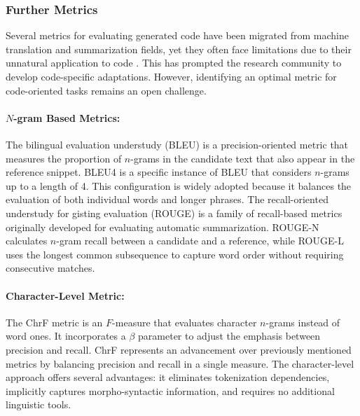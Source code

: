 
\subsubsection*{Further Metrics}

Several metrics for evaluating generated code have been migrated from machine translation and summarization fields, yet they often face limitations due to their unnatural application to code \parencite{evtikhiev2022}. This has prompted the research community to develop code-specific adaptations. However, identifying an optimal metric for code-oriented tasks remains an open challenge.

\begin{sloppypar}
\paragraph{\(N\)-gram Based Metrics:} The bilingual evaluation understudy (BLEU) \parencite{papineni2002} is a precision-oriented metric that measures the proportion of \(n\)-grams in the candidate text that also appear in the reference snippet. BLEU4 is a specific instance of BLEU that considers \(n\)-grams up to a length of 4. This configuration is widely adopted because it balances the evaluation of both individual words and longer phrases. The recall-oriented understudy for gisting evaluation (ROUGE) \parencite{lin2004} is a family of recall-based metrics originally developed for evaluating automatic summarization. ROUGE-N calculates \(n\)-gram recall between a candidate and a reference, while ROUGE-L uses the longest common subsequence to capture word order without requiring consecutive matches.
\end{sloppypar}

\begin{sloppypar}
\paragraph{Character-Level Metric:} The ChrF metric \parencite{popovic2015} is an \(F\)-measure that evaluates character \(n\)-grams instead of word ones. It incorporates a \(\beta\) parameter to adjust the emphasis between precision and recall. ChrF represents an advancement over previously mentioned metrics by balancing precision and recall in a single measure. The character-level approach offers several advantages: it eliminates tokenization dependencies, implicitly captures morpho-syntactic information, and requires no additional linguistic tools.
\end{sloppypar}

